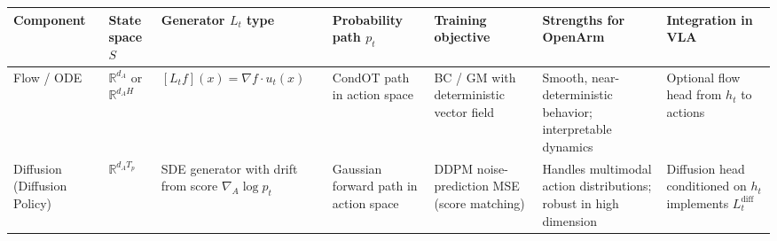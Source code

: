 \documentclass[
]{article}
\newcounter{none} %
\theoremstyle{remark}
\begin{document}
{\def\LTcaptype{none} %
\begin{longtable}[]{@{}
  >{\raggedright\arraybackslash}p{}
  >{\raggedright\arraybackslash}p{}
  >{\raggedright\arraybackslash}p{}
  >{\raggedright\arraybackslash}p{}
  >{\raggedright\arraybackslash}p{}
  >{\raggedright\arraybackslash}p{}
  >{\raggedright\arraybackslash}p{}@{}}
\toprule\noalign{}
\begin{minipage}[b]{\linewidth}\raggedright
Component
\end{minipage} & \begin{minipage}[b]{\linewidth}\raggedright
State space \(S\)
\end{minipage} & \begin{minipage}[b]{\linewidth}\raggedright
Generator \(L_t\) type
\end{minipage} & \begin{minipage}[b]{\linewidth}\raggedright
Probability path \(p_t\)
\end{minipage} & \begin{minipage}[b]{\linewidth}\raggedright
Training objective
\end{minipage} & \begin{minipage}[b]{\linewidth}\raggedright
Strengths for OpenArm
\end{minipage} & \begin{minipage}[b]{\linewidth}\raggedright
Integration in VLA
\end{minipage} \\
\midrule\noalign{}
\endhead
\bottomrule\noalign{}
\endlastfoot
Flow / ODE & \(\mathbb{R}^{d_A}\) or \(\mathbb{R}^{d_A H}\) &
\([L_t f](x) = \nabla f \cdot u_t(x)\) & CondOT path in action space &
BC / GM with deterministic vector field & Smooth, near-deterministic
behavior; interpretable dynamics & Optional flow head from \(h_t\) to
actions \\
Diffusion (Diffusion Policy) & \(\mathbb{R}^{d_A T_p}\) & SDE generator
with drift from score \(\nabla_A \log p_t\) & Gaussian forward path in
action space & DDPM noise-prediction MSE (score matching) & Handles
multimodal action distributions; robust in high dimension & Diffusion
head conditioned on \(h_t\) implements \(L_t^{\text{diff}}\) \\

\end{longtable}}
\end{document}
